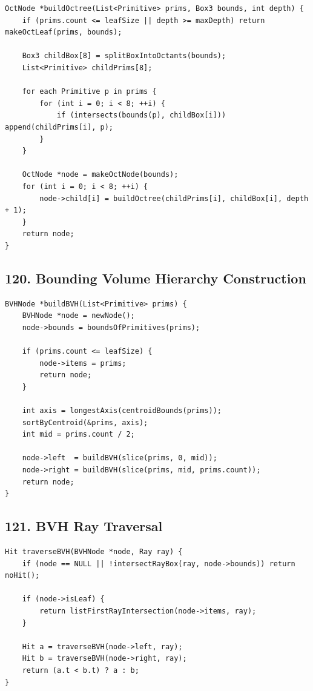 \documentclass[10pt,letterpaper]{article}
\begin{document}
\begin{verbatim}
OctNode *buildOctree(List<Primitive> prims, Box3 bounds, int depth) {
    if (prims.count <= leafSize || depth >= maxDepth) return makeOctLeaf(prims, bounds);

    Box3 childBox[8] = splitBoxIntoOctants(bounds);
    List<Primitive> childPrims[8];

    for each Primitive p in prims {
        for (int i = 0; i < 8; ++i) {
            if (intersects(bounds(p), childBox[i])) append(childPrims[i], p);
        }
    }

    OctNode *node = makeOctNode(bounds);
    for (int i = 0; i < 8; ++i) {
        node->child[i] = buildOctree(childPrims[i], childBox[i], depth + 1);
    }
    return node;
}
\end{verbatim}

\subsection{120. Bounding Volume Hierarchy Construction}

\begin{verbatim}
BVHNode *buildBVH(List<Primitive> prims) {
    BVHNode *node = newNode();
    node->bounds = boundsOfPrimitives(prims);

    if (prims.count <= leafSize) {
        node->items = prims;
        return node;
    }

    int axis = longestAxis(centroidBounds(prims));
    sortByCentroid(&prims, axis);
    int mid = prims.count / 2;

    node->left  = buildBVH(slice(prims, 0, mid));
    node->right = buildBVH(slice(prims, mid, prims.count));
    return node;
}
\end{verbatim}

\subsection{121. BVH Ray Traversal}

\begin{verbatim}
Hit traverseBVH(BVHNode *node, Ray ray) {
    if (node == NULL || !intersectRayBox(ray, node->bounds)) return noHit();

    if (node->isLeaf) {
        return listFirstRayIntersection(node->items, ray);
    }

    Hit a = traverseBVH(node->left, ray);
    Hit b = traverseBVH(node->right, ray);
    return (a.t < b.t) ? a : b;
}
\end{verbatim}
\end{document}
